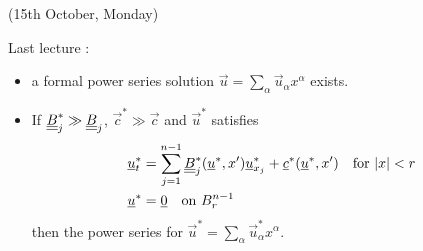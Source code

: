 \documentclass[10pt,a4paper]{report}
\begin{document}
\newday

(15th October, Monday)
\s

Last lecture :
\begin{itemize}
\item a formal power series solution $\vec{u} = \sum_{\alpha} \vec{u}_{\alpha} x^{\alpha}$ exists.

\item If $\underline{\underline{B}}^*_j \gg \underline{\underline{B}}_j$, $\vec{c}^* \gg \vec{c}$ and $\vec{u}^*$ satisfies
\begin{align*}
\underline{u}^*_t &= \sum_{j=1}^{n-1} \underline{\underline{B}}^*_j (\underline{u}^*, x') \underline{u}^*_{x_j} + \underline{c}^*(\underline{u}^*,x') \quad \text{for } |x| <r \\
\underline{u}^* &= \underline{0} \quad \text{on } B_r^{n-1}
\end{align*}
then the power series for $\vec{u}^* = \sum_{\alpha} \vec{u}^*_{\alpha} x^{\alpha}$.
\end{itemize}
\end{document}
